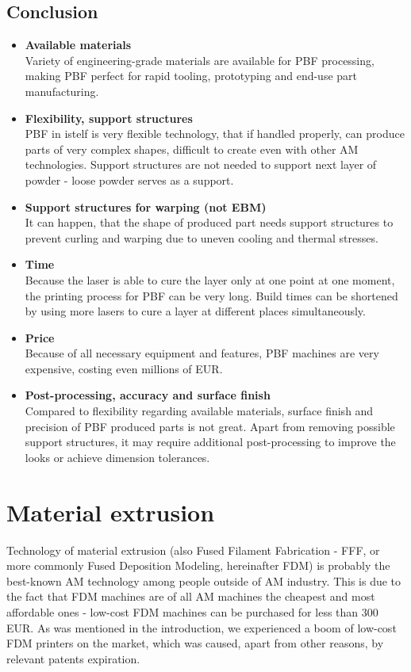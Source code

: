 \documentclass[a4paper, 11pt, reqno]{report}
\newcommand\pro{\item[$+$]}
\newcommand\con{\item[$-$]}
\begin{document}
\clearpage
\section{Conclusion}
\begin{itemize}
\pro \textbf{Available materials}\\
Variety of engineering-grade materials are available for PBF processing, making PBF perfect for rapid tooling, prototyping and end-use part manufacturing.

\pro \textbf{Flexibility, support structures}\\
PBF in istelf is very flexible technology, that if handled properly, can produce parts of very complex shapes, difficult to create even with other AM technologies. Support structures are not needed to support next layer of powder - loose powder serves as a support.
\\[10pt]

\con \textbf{Support structures for warping (not EBM)}\\
It can happen, that the shape of produced part needs support structures to prevent curling and warping due to uneven cooling and thermal stresses.

\con \textbf{Time}\\
Because the laser is able to cure the layer only at one point at one moment, the printing process for PBF can be very long. Build times can be shortened by using more lasers to cure a layer at different places simultaneously.

\con \textbf{Price}\\
Because of all necessary equipment and features, PBF machines are very expensive, costing even millions of EUR.

\con \textbf{Post-processing, accuracy and surface finish}\\
Compared to flexibility regarding available materials, surface finish and precision of PBF produced parts is not great. Apart from removing possible support structures, it may require additional post-processing to improve the looks or achieve dimension tolerances.
\end{itemize}




\chapter{Material extrusion}
Technology of material extrusion (also Fused Filament Fabrication - FFF, or more commonly Fused Deposition Modeling, hereinafter FDM) is probably the best-known AM technology among people outside of AM industry. This is due to the fact that FDM machines are of all AM machines the cheapest and most affordable ones - low-cost FDM machines can be purchased for less than 300 EUR. As was mentioned in the introduction, we experienced a boom of low-cost FDM printers on the market, which was caused, apart from other reasons, by relevant patents expiration.
\end{document}
